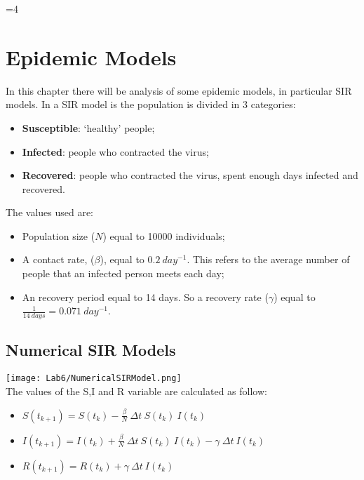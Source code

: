 \documentclass[twocolumn,letterpaper]{report}
\newcounter{debug}
\begin{document}
\ifnum\value{debug}=4 {
    
\chapter{Epidemic Models}
\noindent
	In this chapter there will be analysis of some epidemic models, in particular SIR models. In a SIR model is the population is divided in 3 categories:
	\begin{itemize}
					\item \textbf{Susceptible}: `healthy' people;
					\item \textbf{Infected}: people who contracted the virus;
					\item \textbf{Recovered}: people who contracted the virus, spent enough days infected and recovered.
				\end{itemize}
	\noindent
	The values used are:
	\begin{itemize}
					\item Population size ($N$) equal to 10000 individuals;
					\item A contact rate, ($\beta$), equal to $0.2 \: day^{-1}$. This refers to the average number of people that an infected person meets each day;
					\item An recovery period equal to 14 days. So a recovery rate ($\gamma$) equal to $\frac{1}{14 \: days}=0.071 \: day^{-1}$.
				\end{itemize}
				
				
	 \section{Numerical SIR Models}
	 						\texttt{[image: Lab6/NumericalSIRModel.png]} \\
								The values of the S,I and R variable are calculated as follow:
								\begin{itemize}
								  \item[] \hspace{10mm} $S(t_{k+1}) = S(t_{k}) - \frac{\beta}{N} \: \Delta t \: S(t_{k}) \: I(t_{k})$
									\item[] \hspace{10mm} $I(t_{k+1}) = I(t_{k}) + \frac{\beta}{N} \: \Delta t \: S(t_{k}) \: I(t_{k}) - \gamma \: \Delta t \: I(t_k)$
									\item[] \hspace{10mm} $R(t_{k+1}) = R(t_{k}) + \gamma \: \Delta t \: I(t_k)$
								\end{itemize}
								
}
\end{document}
